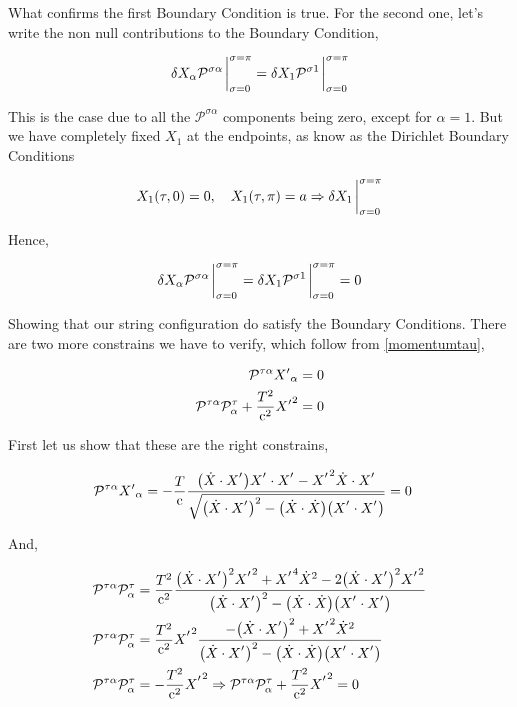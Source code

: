 What confirms the first Boundary Condition is true. For the second one, let's write the non null contributions to the 
Boundary Condition,

\begin{align*}
    \delta X_\alpha\mathcal P^{\sigma\alpha}\eval_{\sigma=0}^{\sigma=\pi}=\delta X_1\mathcal P^{\sigma1}\eval_{\sigma=0}^{\sigma=\pi}
\end{align*}

This is the case due to all the $\mathcal P^{\sigma\alpha}$ components being zero, except for $\alpha=1$. But we have completely fixed $X_1$ at the 
endpoints, as know as the Dirichlet Boundary Conditions

\begin{align*}
    X_1\qty(\tau,0)=0,\ \ \ X_1\qty(\tau,\pi)=a\Rightarrow \delta X_1\eval_{\sigma=0}^{\sigma=\pi}
\end{align*}

Hence,

\begin{align*}
    \delta X_\alpha\mathcal P^{\sigma\alpha}\eval_{\sigma=0}^{\sigma=\pi}=\delta X_1\mathcal P^{\sigma1}\eval_{\sigma=0}^{\sigma=\pi}=0
\end{align*}

Showing that our string configuration do satisfy the Boundary Conditions. There are two more constrains we have to verify, which follow from \ref{momentumtau},

\begin{align*}
    \mathcal P^{\tau\alpha}{X'}_\alpha&=0\\
    \mathcal P^{\tau\alpha}\mathcal P^{\tau}_\alpha+\frac{T^2}{\textnormal{c}^2}{X'}^2&=0
\end{align*}

First let us show that these are the right constrains,

\begin{align*}
    \mathcal P^{\tau\alpha}{X'}_\alpha&=-\frac{T}{\luz}\frac{\qty(\dot X\cdot X^\sidev){X^\sidev\cdot X^\sidev}-{X^\sidev}^2{\dot X\cdot X^\sidev}}{\sqrt{\qty(\dot X\cdot X^\sidev)^2- \qty(\dot X\cdot \dot X)\qty(X^\sidev\cdot X^\sidev) }}=0
\end{align*}

And,

\begin{align*}
    \mathcal P^{\tau\alpha}\mathcal P^{\tau}_\alpha&=\frac{T^2}{\luz^2}\frac{\qty(\dot X\cdot X^\sidev)^2{X^\sidev}^2+{X^\sidev}^4{\dot X}^2-2\qty(\dot X\cdot X^\sidev)^2{X^\sidev}^2}{\qty(\dot X\cdot X^\sidev)^2- \qty(\dot X\cdot \dot X)\qty(X^\sidev\cdot X^\sidev) }\\
    \mathcal P^{\tau\alpha}\mathcal P^{\tau}_\alpha&=\frac{T^2}{\luz^2}{X^\sidev}^2\frac{-\qty(\dot X\cdot X^\sidev)^2+{X^\sidev}^2{\dot X}^2}{\qty(\dot X\cdot X^\sidev)^2- \qty(\dot X\cdot \dot X)\qty(X^\sidev\cdot X^\sidev) }\\
    \mathcal P^{\tau\alpha}\mathcal P^{\tau}_\alpha&=-\frac{T^2}{\luz^2}{X^\sidev}^2\Rightarrow \mathcal P^{\tau\alpha}\mathcal P^{\tau}_\alpha+\frac{T^2}{\luz^2}{X^\sidev}^2=0
\end{align*}

